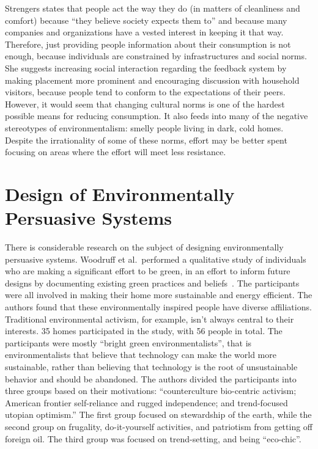 Strengers states that people act the way they do (in matters of cleanliness and comfort) because ``they believe society expects them to'' and because many companies and organizations have a vested interest in keeping it that way. Therefore, just providing people information about their consumption is not enough, because individuals are constrained by infrastructures and social norms. She suggests increasing social interaction regarding the feedback system by making placement more prominent and encouraging discussion with household visitors, because people tend to conform to the expectations of their peers.
However, it would seem that changing cultural norms is one of the hardest possible means for reducing consumption. It also feeds into many of the negative stereotypes of environmentalism: smelly people living in dark, cold homes. Despite the irrationality of some of these norms, effort may be better spent focusing on areas where the effort will meet less resistance.


\section{Design of Environmentally Persuasive Systems}

There is considerable research on the subject of designing environmentally persuasive systems. Woodruff et al.\ performed a qualitative study of individuals who are making a significant effort to be green, in an effort to inform future designs by documenting existing green practices and beliefs~\cite{Woodruff2008-bright-green}. The participants were all involved in making their home more sustainable and energy efficient. The authors found that these environmentally inspired people have diverse affiliations. Traditional environmental activism, for example, isn't always central to their interests. 35 homes participated in the study, with 56 people in total. The participants were mostly ``bright green environmentalists'', that is environmentalists that believe that technology can make the world more sustainable, rather than believing that technology is the root of unsustainable behavior and should be abandoned. The authors divided the participants into three groups based on their motivations: ``counterculture bio-centric activism; American frontier self-reliance and rugged independence; and trend-focused utopian optimism.'' The first group focused on stewardship of the earth, while the second group on frugality, do-it-yourself activities, and patriotism from getting off foreign oil. The third group was focused on trend-setting, and being ``eco-chic''.

